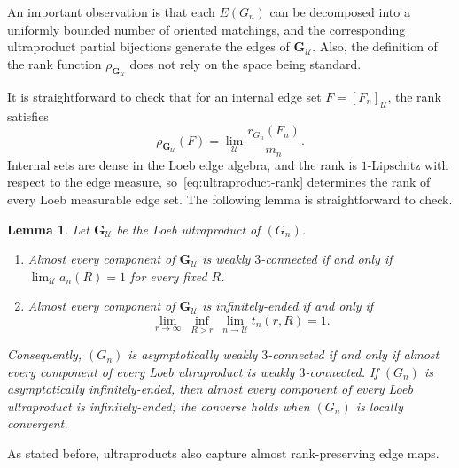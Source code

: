 \documentclass{article}
\theoremstyle{plain}
\newtheorem{lem}[thm]{Lemma}
\theoremstyle{definition}
\newcommand{\cU}{\mathcal{U}}
\begin{document}
An important observation is that each $E(G_n)$ can be decomposed into a uniformly bounded number of oriented matchings, and the corresponding ultraproduct partial bijections generate the edges of $\mathbf{G}_{\cU}$. Also, the definition of the rank function $\rho_{\mathbf G_{\cU}}$ does not rely on the space being standard.

It is straightforward to check that for an internal edge set $F=[F_n]_{\cU}$, the rank satisfies
\begin{equation}\label{eq:ultraproduct-rank}
    \rho_{\mathbf G_{\cU}}(F)
    =\lim_{\cU}\frac{r_{G_n}(F_n)}{m_n}.
\end{equation}
Internal sets are dense in the Loeb edge algebra, and the rank is $1$-Lipschitz with respect to the edge measure, so~\eqref{eq:ultraproduct-rank} determines the rank of every Loeb measurable edge set. The following lemma is straightforward to check.


\begin{lem}\label{lem:ultraproduct-connectivity}
Let $\mathbf G_{\cU}$ be the Loeb ultraproduct of $(G_n)$.
\begin{enumerate}
    \item Almost every component of $\mathbf G_{\cU}$ is weakly $3$-connected if and only if $\lim_{\cU}a_n(R)=1$ for every fixed $R$.
    \item Almost every component of $\mathbf G_{\cU}$ is infinitely-ended if and only if
    \[
        \lim_{r\to\infty}\ \inf_{R>r}\ \lim_{n \to \cU}t_n(r,R)=1.
    \]
\end{enumerate}
Consequently, $(G_n)$ is asymptotically weakly $3$-connected if and only if almost every component of every Loeb ultraproduct is weakly $3$-connected. If $(G_n)$ is asymptotically infinitely-ended, then almost every component of every Loeb ultraproduct is infinitely-ended; the converse holds when $(G_n)$ is locally convergent.
\end{lem}


As stated before, ultraproducts also capture almost rank-preserving edge maps.
\end{document}
